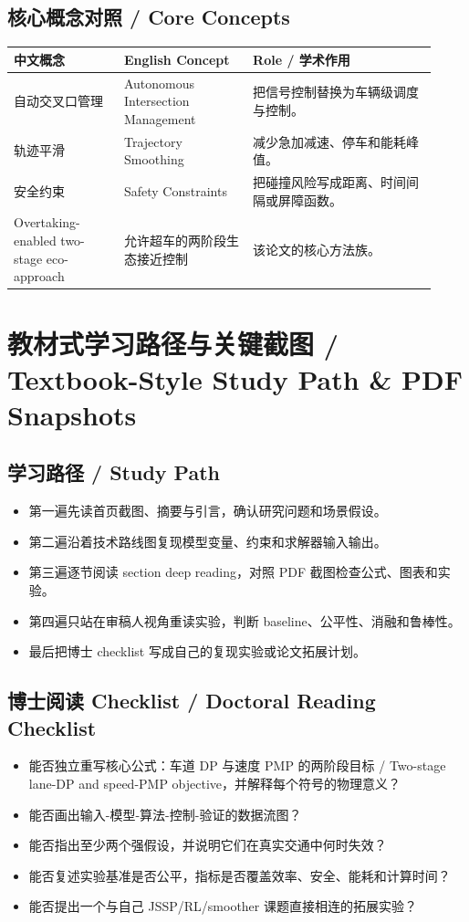 \documentclass[UTF8,a4paper,11pt,fontset=fandol]{ctexart}
\begin{document}
\subsection{核心概念对照 / Core Concepts}
\begin{longtable}{p{0.24\linewidth}p{0.28\linewidth}p{0.40\linewidth}}
\toprule
中文概念 & English Concept & Role / 学术作用\\
\midrule
自动交叉口管理 & Autonomous Intersection Management & 把信号控制替换为车辆级调度与控制。 \\
轨迹平滑 & Trajectory Smoothing & 减少急加减速、停车和能耗峰值。 \\
安全约束 & Safety Constraints & 把碰撞风险写成距离、时间间隔或屏障函数。 \\
Overtaking-enabled two-stage eco-approach & 允许超车的两阶段生态接近控制 & 该论文的核心方法族。 \\
\bottomrule
\end{longtable}

\section{教材式学习路径与关键截图 / Textbook-Style Study Path \& PDF Snapshots}
\subsection{学习路径 / Study Path}
\begin{itemize}
\item 第一遍先读首页截图、摘要与引言，确认研究问题和场景假设。
\item 第二遍沿着技术路线图复现模型变量、约束和求解器输入输出。
\item 第三遍逐节阅读 section deep reading，对照 PDF 截图检查公式、图表和实验。
\item 第四遍只站在审稿人视角重读实验，判断 baseline、公平性、消融和鲁棒性。
\item 最后把博士 checklist 写成自己的复现实验或论文拓展计划。
\end{itemize}


\subsection{博士阅读 Checklist / Doctoral Reading Checklist}
\begin{itemize}
\item 能否独立重写核心公式：车道 DP 与速度 PMP 的两阶段目标 / Two-stage lane-DP and speed-PMP objective，并解释每个符号的物理意义？
\item 能否画出输入-模型-算法-控制-验证的数据流图？
\item 能否指出至少两个强假设，并说明它们在真实交通中何时失效？
\item 能否复述实验基准是否公平，指标是否覆盖效率、安全、能耗和计算时间？
\item 能否提出一个与自己 JSSP/RL/smoother 课题直接相连的拓展实验？
\end{itemize}
\end{document}
